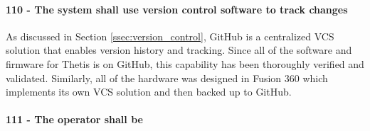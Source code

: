 \paragraph*{110 - The system shall use version control software to track changes} As discussed in Section \ref{ssec:version_control}, GitHub is a centralized VCS solution that enables version history and tracking.
Since all of the software and firmware for Thetis is on GitHub, this capability has been thoroughly verified and validated.
Similarly, all of the hardware was designed in Fusion 360 which implements its own VCS solution and then backed up to GitHub.

\paragraph*{111 - The operator shall be }